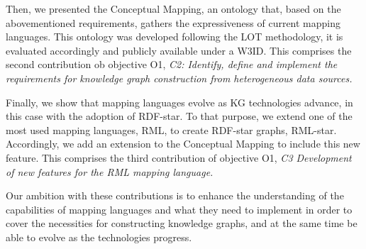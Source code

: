 Then, we presented the Conceptual Mapping, an ontology that, based on the abovementioned requirements, gathers the expressiveness of current mapping languages. This ontology was developed following the LOT methodology, it is evaluated accordingly and publicly available under a W3ID. 
This comprises the second contribution ob objective O1, \textit{C2: Identify, define and implement the requirements for knowledge graph construction from heterogeneous data sources.}

Finally, we show that mapping languages evolve as KG technologies advance, in this case with the adoption of RDF-star. To that purpose, we extend one of the most used mapping languages, RML, to create RDF-star graphs, RML-star. Accordingly, we add an extension to the Conceptual Mapping to include this new feature. This comprises the third contribution of objective O1, \textit{C3 Development of new features for the RML mapping language.}

Our ambition with these contributions is to enhance the understanding of the capabilities of mapping languages and what they need to implement in order to cover the necessities for constructing knowledge graphs, and at the same time be able to evolve as the technologies progress.